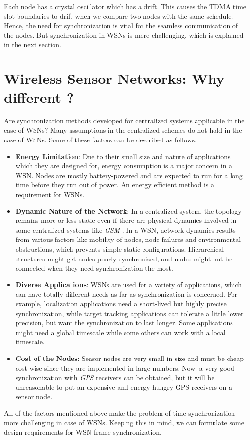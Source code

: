 \documentclass[a4paper,10pt]{report}
\begin{document}
\paragraph*{}
Each node has a crystal oscillator which has a drift. This causes the TDMA time slot boundaries to drift when we compare two nodes with the same schedule. Hence, the need for synchronization is vital for the seamless communication of the nodes. But synchronization in WSNs is more challenging, which is explained in the next section.
\section{\textbf{Wireless Sensor Networks: Why different ?}}
Are synchronization methods developed for centralized systems applicable in the case of WSNs? Many assumptions in the centralized schemes do not hold in the case of WSNs. Some of these factors can be described as follows:
\begin{itemize}
\item \textbf{Energy Limitation}: Due to their small size and nature of applications which they are designed for, energy consumption is a major concern in a WSN. Nodes are mostly battery-powered and are expected to run for a long time before they run out of power. An energy efficient method is a requirement for WSNs.
\item \textbf{Dynamic Nature of the Network}: In a centralized system, the topology remains more or less static even if there are physical
dynamics involved  in some centralized systems like \textit{GSM} . In a WSN, network dynamics results from various factors like mobility of nodes, node failures and environmental obstructions, which prevents simple static configurations. Hierarchical structures might get nodes poorly synchronized, and nodes might not be connected when they need
synchronization the most.
\item \textbf{Diverse Applications}: WSNs are used for a variety of applications, which can have totally different needs as far as synchronization is concerned. For example, localization applications need a short-lived but highly
precise synchronization, while target tracking applications can tolerate a little lower precision, but want the synchronization to
last longer. Some applications might need a global timescale while some others can work with a local timescale.
\item \textbf{Cost of the Nodes}: Sensor nodes are very small in size and must be cheap cost wise since they are implemented in large
numbers. Now, a very good synchronization with \textit{GPS} receivers can be obtained, but it will be unreasonable to put an expensive and energy-hungry GPS receivers on a sensor node.
\end{itemize}
All of the factors mentioned above make the problem of time synchronization more challenging in case of WSNs. Keeping this in mind, we can formulate some design requirements for WSN frame synchronization.
\end{document}
